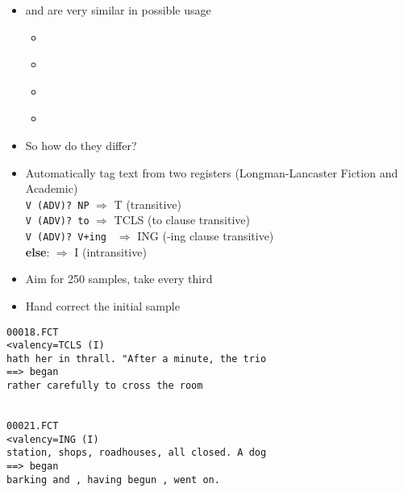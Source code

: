 \documentclass[a4paper,landscape,headrule,footrule,xetex]{foils}
\begin{document}
\MyLogo{}

\begin{itemize}
\item {} and  are very similar in possible usage
  \begin{itemize}
  \item {}
    \\ 
  \item {}
    \\ 
  \item {}
    \\ 
  \item {}
    \\ 
  \end{itemize}
\item So how do they differ?
\end{itemize}

\MyLogo{}
\begin{itemize}
\item Automatically tag text from two registers 
(Longman-Lancaster Fiction and Academic)
\\ \texttt{V (ADV)? NP} $\Rightarrow$ T (transitive) 
\\ \texttt{V (ADV)? to} $\Rightarrow$ TCLS (to clause transitive)
\\ \texttt{V (ADV)? V+ing } $\Rightarrow$ ING (-ing clause transitive)
\\ \textbf{else}: $\Rightarrow$ I (intransitive)
\item Aim for 250 samples, take every third 
\item Hand correct the initial sample
\end{itemize}


\begin{verbatim}
00018.FCT
<valency=TCLS (I)
hath her in thrall. "After a minute, the trio
==> began
rather carefully to cross the room


00021.FCT
<valency=ING (I)
station, shops, roadhouses, all closed. A dog
==> began
barking and , having begun , went on.
\end{verbatim}

\end{document}
